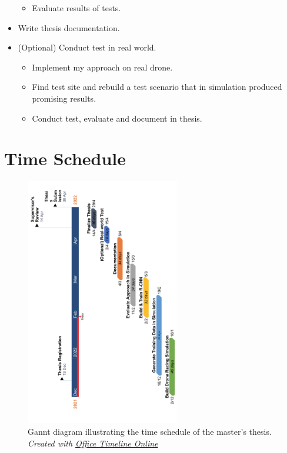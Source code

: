 \begin{itemize}
\begin{itemize}
		\item Evaluate results of tests.
	\end{itemize}
	\item Write thesis documentation.
	\item (Optional) Conduct test in real world.
	\begin{itemize}
		\item Implement my approach on real drone.
		\item Find test site and rebuild a test scenario that in simulation produced promising results.
		\item Conduct test, evaluate and document in thesis.
	\end{itemize} 
 
\end{itemize}

	
\chapter{Time Schedule}

\begin{figure}[H]
    \centering
    \includegraphics[width=0.6\textwidth]{figures/Software Development.png}
    \caption[Gannt diagram illustrating the time schedule of the master's thesis.]{Gannt diagram illustrating the time schedule of the master's thesis. \textit{Created with \href{https://online.officetimeline.com/}{Office Timeline Online}}}
    \label{fig:Timeline}
\end{figure}

